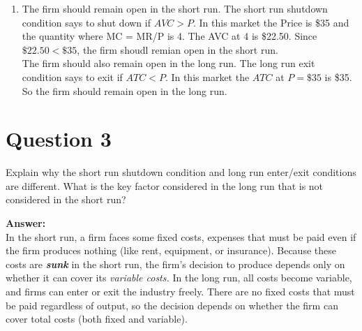 \documentclass[12pt]{article}
\begin{document}
\begin{enumerate}[label = (\alph*)]
\begin{center}
        \end{center}

    \item The firm should remain open in the short run. The short run shutdown condition says to shut down if $AVC > P$. In this market the Price is \$35 and the quantity where MC = MR/P is 4. The AVC at 4 is \$22.50. Since $\$22.50 < \$35 $, the firm shoudl remian open in the short run. \\
    The firm should also remain open in the long run. The long run exit condition says to exit if $ATC < P$. In this market the $ATC$ at $P = \$35 $ is \$35. So the firm should remain open in the long run.
\end{enumerate}




\section*{Question 3}
Explain why the short run shutdown condition and long run enter/exit conditions are different. What is the key factor considered in the long run that is not considered in the short run?

\vspace{3mm}

\textbf{Answer:} \\
In the short run, a firm faces some fixed costs, expenses that must be paid even if the firm produces nothing (like rent, equipment, or insurance). Because these costs are \textit{\textbf{sunk}} in the short run, the firm’s decision to produce depends only on whether it can cover its \textit{variable costs.}
In the long run, all costs become variable, and firms can enter or exit the industry freely. There are no fixed costs that must be paid regardless of output, so the decision depends on whether the firm can cover total costs (both fixed and variable).
\end{document}
